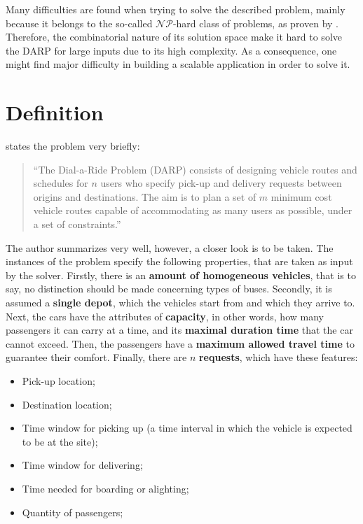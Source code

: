 \documentclass[tuberlin,cic,tc,openright,english,noabntcite,oneside]{iiufrgs}
\begin{document}
Many difficulties are found when trying to solve the described problem, mainly because it belongs to the so-called $\mathcal{NP}$-hard class of problems, as proven by \textcite{baugh_jr._intractability_1998}. Therefore, the combinatorial nature of its solution space make it hard to solve the DARP for large inputs due to its high complexity. As a consequence, one might find major difficulty in building a scalable application in order to solve it.

\section{Definition}
\textcite[p. 29]{cordeau_dial--ride_2007} states the problem very briefly:
\begin{quote}
\enquote{The Dial-a-Ride Problem (DARP) consists of designing vehicle routes and schedules for $n$ users who specify pick-up and delivery requests between origins and destinations. The aim is to plan a set of $m$ minimum cost vehicle routes capable of accommodating as many users as possible, under a set of constraints.}
\end{quote}

The author summarizes very well, however, a closer look is to be taken. The instances of the problem specify the following properties, that are taken as input by the solver. Firstly, there is an \textbf{amount of homogeneous vehicles}, that is to say, no distinction should be made concerning types of buses. Secondly, it is assumed a \textbf{single depot}, which the vehicles start from and which they arrive to. Next, the cars have the attributes of \textbf{capacity}, in other words, how many passengers it can carry at a time, and its \textbf{maximal duration time} that the car cannot exceed. Then, the passengers have a \textbf{maximum allowed travel time} to guarantee their comfort. Finally, there are $n$ \textbf{requests}, which have these features:

\begin{itemize}
\item Pick-up location;
\item Destination location;
\item Time window for picking up (a time interval in which the vehicle is expected to be at the site);
\item Time window for delivering;
\item Time needed for boarding or alighting;
\item Quantity of passengers;
\end{itemize}
\end{document}
